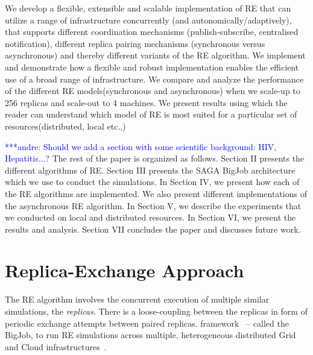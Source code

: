 \documentclass[a4paper,10pt]{article}
\newcommand{\jhanote}[1]{ {\textcolor{red} { ***shantenu: #1 }}}
\newcommand{\alnote}[1]{ {\textcolor{blue} { ***andre: #1 }}}
\newcommand{\alnote}[1]{}
\newcommand{\jhanote}[1]{}
\begin{document}
We develop a flexible, extensible and scalable
implementation of RE that can utilize a range of infrastructure
concurrently (and autonomically/adaptively), that supports different
coordination mechanisms (publish-subscribe, centralised notification),
different replica pairing mechanisms (synchronous versus asynchronous)
and thereby different variants of the RE algorithm. We implement and
demonstrate how a flexible and robust implementation enables the
efficient use of a broad range of infrastructure. We compare and analyze the performance of the different RE models(synchronous and asynchronous) when we scale-up to 256 replicas and scale-out to 4 machines. 
We present results using which the reader can understand which model of RE is most suited for a particular set of resources(distributed, local etc.,)

\alnote{Should we add a section with some scientific background: HIV, Hepatitis...?}
The rest of the paper is organized as follows. Section II presents the different algorithms of RE. Section III  presents the SAGA BigJob architecture which we use to conduct the simulations. In Section IV, we present how each of the RE algorithms are implemented. We also present different implementations of the asynchronous RE algorithm. In Section V, we describe the experiments that we conducted on local and distributed resources. In Section VI, we present the results and analysis. Section VII concludes the paper and discusses future work.

\section{Replica-Exchange Approach}
\label{sec:repex-approach}
The RE algorithm involves the concurrent execution of multiple similar
simulations, the \emph{replicas}.  There is a loose-coupling between
the replicas in form of periodic exchange attempts between paired
replicas. %
framework~\cite{saga_bigjob_condor_cloud} -- called the BigJob, to run
RE simulations across multiple, heterogeneous distributed Grid and
Cloud infrastructures~\cite{Luckow:2008fp}.
\end{document}
